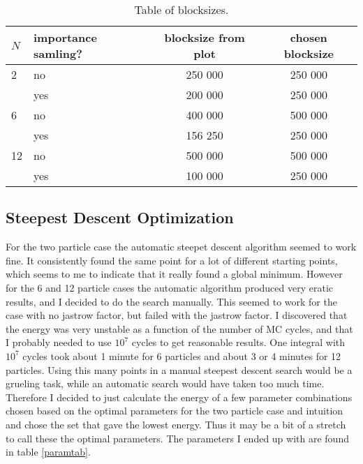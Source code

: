 \documentclass[a4paper,English,10pt]{article}
\begin{document}
\begin{table}
  \begin{center}
    \caption{Table of blocksizes. }
    \label{blocktable}
    \begin{tabular}{llcc}
      \toprule
      $N$ & importance samling? & blocksize from plot & chosen blocksize \\
      \midrule
      2 & no & 250 000 & 250 000\\
      & yes & 200 000 & 250 000\\
      \midrule
      6 & no & 400 000 & 500 000\\
      & yes & 156 250 & 250 000\\
      \midrule
      12 & no & 500 000 & 500 000\\
      & yes & 100 000 & 250 000\\
      \bottomrule
    \end{tabular}
  \end{center}
\end{table}



\subsection{Steepest Descent Optimization}
For the two particle case the automatic steepet descent algorithm seemed to work fine. It consistently found the same point
for a lot of different starting points, which seems to me to indicate that it really found a global minimum. However for the 6 and 12 particle
cases the automatic algorithm produced very eratic results, and I decided to do the search manually. This seemed to work for the case with no jastrow factor,
but failed with the jastrow factor. I discovered that the energy was very unstable as a function of the number of MC cycles, and that I probably needed
to use $10^7$ cycles to get reasonable results. One integral with $10^7$ cycles took about 1 minute for 6 particles and about 3 or 4 minutes for 12 particles.
Using this many points in a manual steepest descent search would be a grueling task, while an automatic search would have taken too much time. Therefore I decided
to just calculate the energy of a few parameter combinations chosen based on the optimal parameters for the two particle case and intuition and chose the set
that gave the lowest energy. Thus it may be a bit of a stretch to call these the optimal parameters. The parameters I ended up with are found in table \ref{paramtab}.
\end{document}
